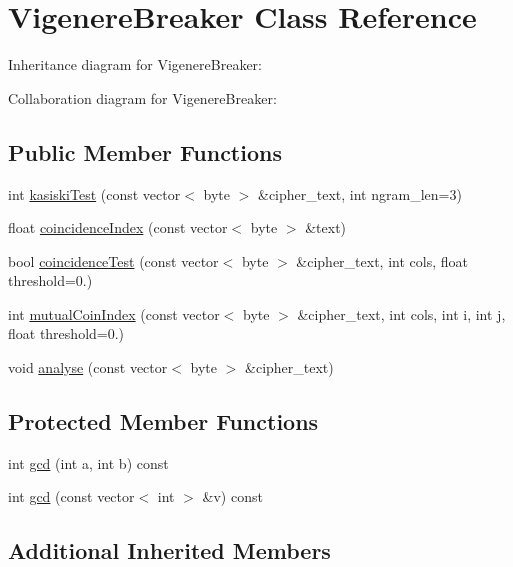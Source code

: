 \hypertarget{classVigenereBreaker}{}\section{Vigenere\+Breaker Class Reference}
\label{classVigenereBreaker}


Inheritance diagram for Vigenere\+Breaker\+:


Collaboration diagram for Vigenere\+Breaker\+:
\subsection*{Public Member Functions}
\begin{DoxyCompactItemize}
\item 
int \hyperlink{classVigenereBreaker_aaa9154379a64b4d3e63c21abdc8a2270}{kasiski\+Test} (const vector$<$ byte $>$ \&cipher\+\_\+text, int ngram\+\_\+len=3)
\item 
float \hyperlink{classVigenereBreaker_a9f3763cd550c2f97b09dc3c9e872ef4a}{coincidence\+Index} (const vector$<$ byte $>$ \&text)
\item 
bool \hyperlink{classVigenereBreaker_a52abe1abb911197d3df281d33568e31a}{coincidence\+Test} (const vector$<$ byte $>$ \&cipher\+\_\+text, int cols, float threshold=0.)
\item 
int \hyperlink{classVigenereBreaker_ac507990f1124fbbb419d0444fea290c4}{mutual\+Coin\+Index} (const vector$<$ byte $>$ \&cipher\+\_\+text, int cols, int i, int j, float threshold=0.)
\item 
void \hyperlink{classVigenereBreaker_a6ba37c849739dcda0a06ed0596ae1bf5}{analyse} (const vector$<$ byte $>$ \&cipher\+\_\+text)
\end{DoxyCompactItemize}
\subsection*{Protected Member Functions}
\begin{DoxyCompactItemize}
\item 
int \hyperlink{classVigenereBreaker_aca7fe8477586cc1b134835e5ca6d1882}{gcd} (int a, int b) const
\item 
int \hyperlink{classVigenereBreaker_aa68812c04ec6674d69bfe36d4e1e84c6}{gcd} (const vector$<$ int $>$ \&v) const
\end{DoxyCompactItemize}
\subsection*{Additional Inherited Members}


